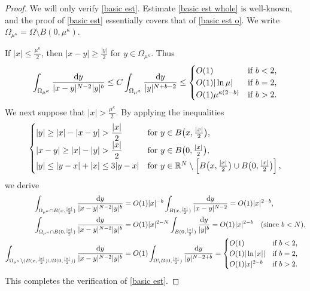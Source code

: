 \documentclass[reqno]{amsart}
\theoremstyle{remark}
\newcommand{\R}{\mathbb{R}}
\newcommand{\dy}{\textup{d}y}
\renewcommand{\(}{\left(}
\renewcommand{\)}{\right)}
\numberwithin{equation}{section}
\begin{document}
\begin{proof}
We will only verify \eqref{basic est}. Estimate \eqref{basic est whole} is well-known, and the proof of \eqref{basic est} essentially covers that of \eqref{basic est o}. We write $\Omega_{\mu^\kappa} = \Omega \setminus B(0,\mu^\kappa)$.

If $|x|\le \frac{\mu^\kappa}{2}$, then $|x-y|\ge \frac{|y|}{2}$ for $y \in \Omega_{\mu^\kappa}$. Thus
\[\int_{\Omega_{\mu^\kappa}} \frac{\dy}{|x-y|^{N-2}|y|^b}\le C\int_{\Omega_{\mu^\kappa}} \frac{\dy}{|y|^{N+b-2}} \le \begin{cases}
O(1) &\textup{if } b<2, \\
O(1) |\ln\mu| &\textup{if } b=2, \\
O(1)\mu^{\kappa(2-b)} &\textup{if } b>2.
\end{cases}\]
We next suppose that $|x|> \frac{\mu^\kappa}{2}$. By applying the inequalities
\[\begin{cases}
|y| \ge |x|-|x-y| > \dfrac{|x|}{2} &\textup{for } y \in B\big(x,\frac{|x|}{2}\big),\\
|x-y| \ge |x|-|y| > \dfrac{|x|}{2} &\textup{for } y \in B\big(0,\frac{|x|}{2}\big),\\
|y| \le |y-x|+|x| \le 3|y-x| &\textup{for } y \in \R^N \setminus \left[B\big(x,\frac{|x|}{2}\big) \cup B\big(0,\frac{|x|}{2}\big)\right],
\end{cases}\]
we derive
\begin{align*}
\int_{\Omega_{\mu^\kappa} \cap B(x,\frac{|x|}{2})} \frac{\dy}{|x-y|^{N-2}|y|^b} &= O(1)|x|^{-b} \int_{B(x,\frac{|x|}{2})}\frac{\dy}{|x-y|^{N-2}} = O(1)|x|^{2-b},\\
\int_{\Omega_{\mu^\kappa} \cap B(0,\frac{|x|}{2})} \frac{\dy}{|x-y|^{N-2}|y|^b} &= O(1)|x|^{2-N} \int_{B(0,\frac{|x|}{2})} \frac{\dy}{|y|^b} = O(1)|x|^{2-b} \quad (\textup{since } b<N),\\
\int_{\Omega_{\mu^\kappa} \setminus (B(x,\frac{|x|}{2}) \cup B(0,\frac{|x|}{2}))} \frac{\dy}{|x-y|^{N-2}|y|^b} &= O(1) \int_{\Omega \setminus B(0,\frac{|x|}{2})} \frac{\dy}{|y|^{N-2+b}} = \begin{cases}
O(1) &\textup{if } b<2,\\
O(1) |\ln|x|| &\textup{if } b=2,\\
O(1)|x|^{2-b} &\textup{if } b>2.
\end{cases}
\end{align*}
This completes the verification of \eqref{basic est}.
\end{proof}
\end{document}
